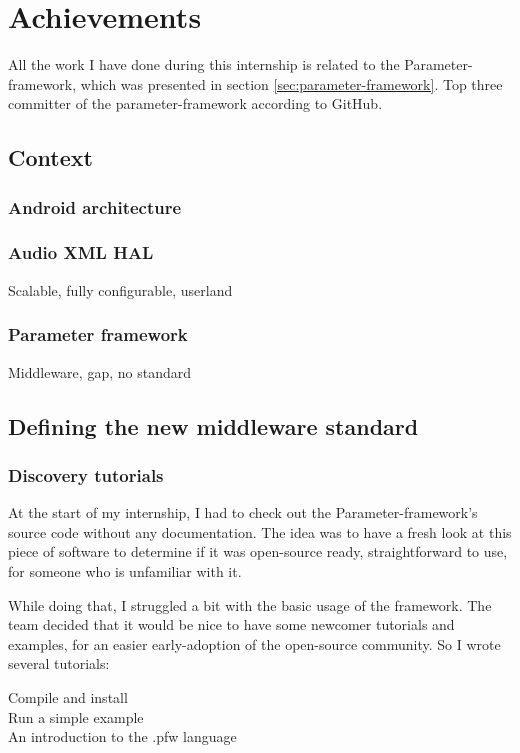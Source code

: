 \chapter{Achievements}

\begin{sectionIntro}
    All the work I have done during this internship is related
    to the Parameter-framework, which was presented in section
    \ref{sec:parameter-framework}.
    Top three committer of the parameter-framework according to GitHub.
\end{sectionIntro}

\section{Context}

\subsection{Android architecture}

\subsection{Audio XML HAL}
Scalable, fully configurable, userland

\subsection{Parameter framework}
Middleware, gap, no standard

\section{Defining the new middleware standard}
\subsection{Discovery tutorials}

At the start of my internship, I had to check out the Parameter-framework's
source code without any documentation. The idea was to have a fresh look at
this piece of software to determine if it was open-source ready, straightforward
to use, for someone who is unfamiliar with it.

While doing that, I struggled a bit with the basic usage of the framework. The
team decided that it would be nice to have some newcomer tutorials and examples,
for an easier early-adoption of the open-source community. So I wrote several
tutorials:
\begin{description}
    \item[Compile and install]
    \item[Run a simple example]
    \item[An introduction to the .pfw language]\label{desc:pfw-language}
\end{description}

